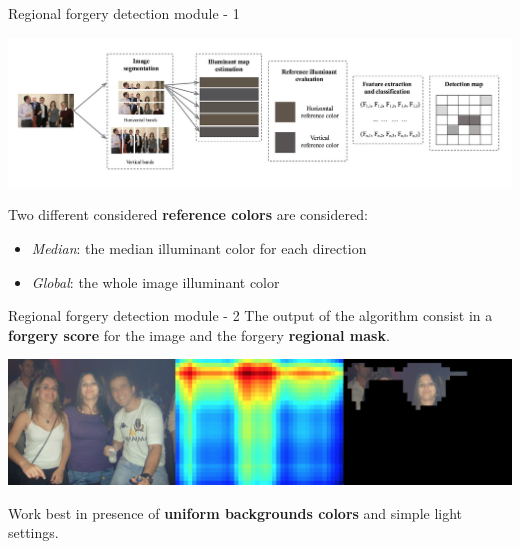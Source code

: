 \begin{tframe}{Regional forgery detection module - 1}
\begin{center}
\includegraphics[width=1\textwidth]{images/pipeline_regions.jpg}
\end{center}
\vspace{0.2cm}
Two different considered \textbf{reference colors} are considered:
\vspace{0.3cm}
\begin{itemize}
\item \emph{Median}: the median illuminant color for each direction
\vspace{0.1cm}
\item \emph{Global}: the whole image illuminant color
\end{itemize}
\end{tframe}

\begin{tframe}{Regional forgery detection module - 2}
\vspace{0.1cm}
The output of the algorithm consist in a \textbf{forgery score} for the image and the forgery \textbf{regional mask}.
\vspace{0.2cm}
\begin{center}
\includegraphics[width=1\textwidth]{images/regionalresult.jpg}
\end{center}

\vspace{0.2cm}
Work best in presence of \textbf{uniform backgrounds colors} and simple light settings.
\end{tframe}



